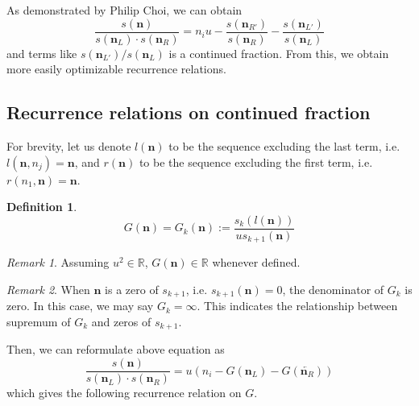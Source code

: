 \documentclass{article}
\theoremstyle{definition}
\newtheorem*{definition}{Definition}
\theoremstyle{plain}
\theoremstyle{remark}
\newtheorem*{remark}{Remark}
\numberwithin{equation}{section}
\newcommand{\bR}{\mathbb{R}}
\begin{document}
As demonstrated by Philip Choi, we can obtain
\[
  \frac{s(\mathbf{n})}{s(\mathbf{n}_L) \cdot s(\mathbf{n}_R)}
  = n_i u - \frac{s(\mathbf{n}_{R'})}{s(\mathbf{n}_R)} - \frac{s(\mathbf{n}_{L'})}{s(\mathbf{n}_L)}
\]
and terms like $s(\mathbf{n}_{L'}) / s(\mathbf{n}_L)$ is a continued fraction.
From this, we obtain more easily optimizable recurrence relations.

\subsection{Recurrence relations on continued fraction}

\let\rev\overleftarrow

For brevity, let us denote $l(\mathbf{n})$ to be the sequence excluding the last term,
i.e. $l(\mathbf{n}, n_j) = \mathbf{n}$,
and $r(\mathbf{n})$ to be the sequence excluding the first term,
i.e. $r(n_1, \mathbf{n}) = \mathbf{n}$.

\begin{definition}
  \[ G(\mathbf{n}) = G_k(\mathbf{n}) := \frac{s_k(l(\mathbf{n}))}{u s_{k+1}(\mathbf{n})} \]
\end{definition}

\begin{remark}
  Assuming $u^2 \in \bR$, $G(\mathbf{n}) \in \bR$ whenever defined.
\end{remark}

\begin{remark}
  When $\mathbf{n}$ is a zero of $s_{k+1}$, i.e. $s_{k+1}(\mathbf{n}) = 0$,
  the denominator of $G_k$ is zero. In this case, we may say $G_k = \infty$.
  This indicates the relationship between supremum of $G_k$ and zeros of $s_{k+1}$.
\end{remark}

Then, we can reformulate above equation as
\begin{equation}\label{chebyshev_and_fraction}
  \frac{s(\mathbf{n})}{s(\mathbf{n}_L) \cdot s(\mathbf{n}_R)}
  = u (n_i - G(\mathbf{n}_L) - G(\overleftarrow{\mathbf{n}_R}))
\end{equation}
which gives the following recurrence relation on $G$.

\def\ns {\mathbf{n}}
\def\nsL {\mathbf{n}_L}
\def\nsR {\mathbf{n}_R}
\def\nsLl {\mathbf{n}_{L'}}
\def\nsRr {\mathbf{n}_{R'}}
\end{document}
